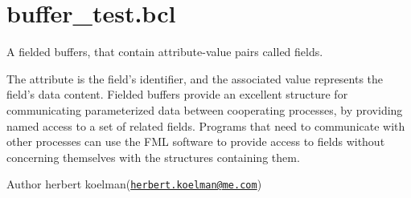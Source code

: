 \hypertarget{buffer_test_8bcl-example}{\section{buffer\+\_\+test.\+bcl}
}
A fielded buffers, that contain attribute-\/value pairs called fields.

The attribute is the field’s identifier, and the associated value represents the field’s data content. Fielded buffers provide an excellent structure for communicating parameterized data between cooperating processes, by providing named access to a set of related fields. Programs that need to communicate with other processes can use the F\+M\+L software to provide access to fields without concerning themselves with the structures containing them.

\begin{DoxyAuthor}{Author}
herbert koelman(\href{mailto:herbert.koelman@me.com}{\tt herbert.\+koelman@me.\+com})
\end{DoxyAuthor}

